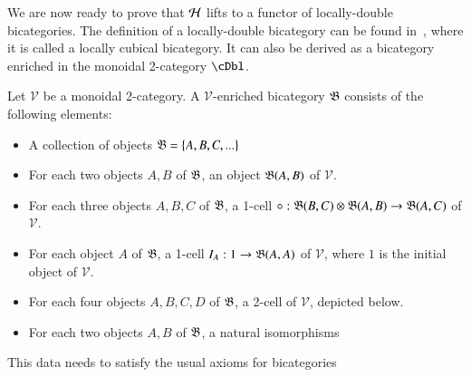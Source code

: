 We are now ready to prove that $\mathcal{H}$ lifts to a functor of locally-double bicategories. The definition of a locally-double bicategory can be found in~\cite{gg:ldstr-tricat}, where it is called a locally cubical bicategory. It can also be derived as a bicategory enriched in the monoidal 2-category $\cDbl$.

\begin{defn}
Let $\mathcal{V}$ be a monoidal 2-category. A $\mathcal{V}$-enriched bicategory $\mathfrak{B}$ consists of the following elements:
\begin{itemize}
\item A collection of objects $\mathfrak{B}=\{A,B,C,...\} $
\item For each two objects $A,B$ of $\mathfrak{B}$, an object $\mathfrak{B}(A,B)$ of $\mathcal{V}$. 
\item For each three objects $A, B, C$ of $\mathfrak{B}$, a 1-cell  $\circ: \mathfrak{B}(B,C) \otimes \mathfrak{B}(A,B) \rightarrow \mathfrak{B}(A,C)$ of $\mathcal{V}$. 
\item For each object $A$ of $\mathfrak{B}$, a 1-cell \newline $I_A: 1 \rightarrow \mathfrak{B}(A,A)$ of $\mathcal{V}$, where $1$ is the initial object of $\mathcal{V}$. 
\item For each four objects $A,B,C,D$ of $\mathfrak{B}$, a 2-cell of $\mathcal{V}$, depicted below. 
  \begin{center}
    
    \end{center}
\item For each two objects $A,B$ of $\mathfrak{B}$, a natural isomorphisms 
  \begin{center}
    
    \end{center}
 \end{itemize}
This data needs to satisfy the usual axioms for bicategories~\cite{maclane}
\end{defn}

